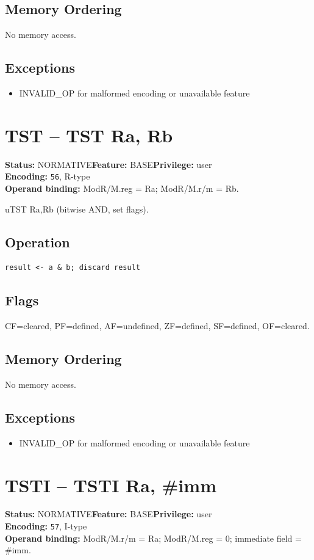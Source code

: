 \documentclass[10pt]{article}
\begin{document}
\subsection*{Memory Ordering}
No memory access.
\subsection*{Exceptions}
\begin{itemize}
\item INVALID\_OP for malformed encoding or unavailable feature
\end{itemize}
\clearpage

\section{TST -- TST Ra, Rb}
\textbf{Status:} NORMATIVE\quad \textbf{Feature:} BASE\quad \textbf{Privilege:} user\\
\textbf{Encoding:} \texttt{56}, R-type\\
\textbf{Operand binding:} ModR/M.reg = Ra; ModR/M.r/m = Rb.

uTST Ra,Rb (bitwise AND, set flags).

\subsection*{Operation}
\begin{lstlisting}
result <- a & b; discard result
\end{lstlisting}
\subsection*{Flags}
CF=cleared, PF=defined, AF=undefined, ZF=defined, SF=defined, OF=cleared.
\subsection*{Memory Ordering}
No memory access.
\subsection*{Exceptions}
\begin{itemize}
\item INVALID\_OP for malformed encoding or unavailable feature
\end{itemize}
\clearpage

\section{TSTI -- TSTI Ra, \#imm}
\textbf{Status:} NORMATIVE\quad \textbf{Feature:} BASE\quad \textbf{Privilege:} user\\
\textbf{Encoding:} \texttt{57}, I-type\\
\textbf{Operand binding:} ModR/M.r/m = Ra; ModR/M.reg = 0; immediate field = \#imm.
\end{document}
